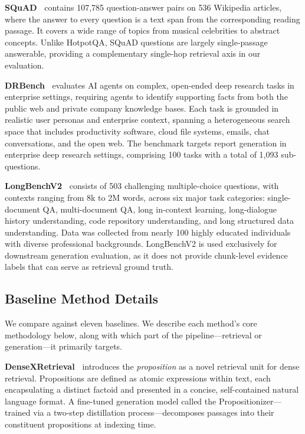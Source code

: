 \noindent
\textbf{SQuAD~\cite{rajpurkar-etal-2016-squad}} contains 107,785 question-answer pairs on 536 Wikipedia articles, where the answer to every question is a text span from the corresponding reading passage.  It covers a wide range of topics from musical celebrities to abstract concepts. Unlike HotpotQA, SQuAD questions are largely single-passage answerable, providing a complementary single-hop retrieval axis in our evaluation.

\noindent
\textbf{DRBench~\cite{abaskohi2026drbench}} evaluates AI agents on complex, open-ended deep research tasks in enterprise settings, requiring agents to identify supporting facts from both the public web and private company knowledge bases. Each task is grounded in realistic user personas and enterprise context, spanning a heterogeneous search space that includes productivity software, cloud file systems, emails, chat conversations, and the open web. The benchmark targets report generation in enterprise deep research settings, comprising 100 tasks with a total of 1,093 sub-questions.

\noindent
\textbf{LongBenchV2~\cite{bai-etal-2025-longbench}} consists of 503 challenging multiple-choice questions, with contexts ranging from 8k to 2M words, across six major task categories: single-document QA, multi-document QA, long in-context learning, long-dialogue history understanding, code repository understanding, and long structured data understanding.  Data was collected from nearly 100 highly educated individuals with diverse professional backgrounds. LongBenchV2 is used exclusively for downstream generation evaluation, as it does not provide chunk-level evidence labels that can serve as retrieval ground truth.

\subsection{Baseline Method Details}
\label{app:baselines}

We compare against eleven baselines. We describe each method's core methodology below, along with which part of the pipeline—retrieval or generation—it primarily targets.

\noindent
\textbf{DenseXRetrieval~\cite{chen-etal-2024-dense}} introduces the \emph{proposition} as a novel retrieval unit for dense retrieval. Propositions are defined as atomic expressions within text, each encapsulating a distinct factoid and presented in a concise, self-contained natural language format.  A fine-tuned generation model called the Propositionizer—trained via a two-step distillation process—decomposes passages into their constituent propositions at indexing time.

